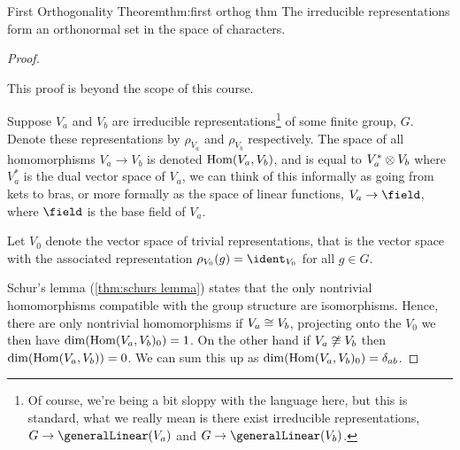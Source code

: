 \begin{thm}{First Orthogonality Theorem}{thm:first orthog thm}
    The irreducible representations form an orthonormal set in the space of
    characters.
    
    \begin{proof}
        \begin{rmk}
            This proof is beyond the scope of this course.
        \end{rmk}
        \vspace{1.5ex}
        Suppose \(V_a\) and \(V_b\) are irreducible
        representations\footnote{Of course, we're being a bit sloppy with the language
            here, but this is standard, what we really mean is there exist irreducible
            representations, \(G \to \generalLinear(V_a)\) and \(G \to
            \generalLinear(V_b)\).} of some finite group, \(G\).
        Denote these representations by \(\rho_{V_a}\) and \(\rho_{V_b}\)
        respectively.
        The space of all homomorphisms \(V_a \to V_b\) is denoted
        \(\operatorname{Hom}(V_a, V_b)\), and is equal to \(V_a^* \otimes V_b\) where \(V_a^*\)
        is the dual vector space of \(V_a\), we can think of this informally as going
        from kets to bras, or more formally as the space of linear functions, \(V_a \to
        \field\), where \(\field\) is the base field of \(V_a\).
        
        Let \(V_0\) denote the vector space of trivial representations, that
        is the vector space with the associated representation \(\rho_{V_0}(g) =
        \ident_{V_0}\) for all \(g \in G\).
        
        Schur's lemma (\cref{thm:schurs lemma}) states that the only
        nontrivial homomorphisms compatible with the group structure are isomorphisms.
        Hence, there are only nontrivial homomorphisms if \(V_a \cong
        V_b\), projecting onto the \(V_0\) we then have \(\dim(\operatorname{Hom}(V_a, V_b)_0) = 1\).
        On the other hand if \(V_a \not\cong V_b\) then
        \(\dim(\operatorname{Hom}(V_a, V_b)) = 0\).
        We can sum this up as \(\dim(\operatorname{Hom}(V_a, V_b)_0) = \delta_{ab}\).
        

\end{proof}
\end{thm}
